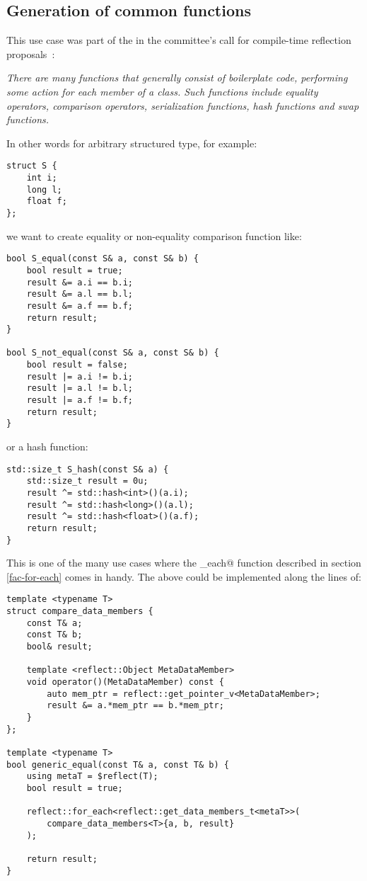 \subsection{Generation of common functions}
\label{use-case-common-func}

This use case was part of the  in the committee's
call for compile-time reflection proposals~\cite{ISOCPP-N3814}: 

{\em There are many functions that generally consist of boilerplate code,
performing some action for each member of a class. Such functions include
equality operators, comparison operators, serialization functions,
hash functions and swap functions.
}

In other words for arbitrary structured type, for example:

\begin{verbatim}
struct S {
	int i;
	long l;
	float f;
};
\end{verbatim}

we want to create equality or non-equality comparison function like:

\begin{verbatim}
bool S_equal(const S& a, const S& b) {
	bool result = true;
	result &= a.i == b.i;
	result &= a.l == b.l;
	result &= a.f == b.f;
	return result;
}

bool S_not_equal(const S& a, const S& b) {
	bool result = false;
	result |= a.i != b.i;
	result |= a.l != b.l;
	result |= a.f != b.f;
	return result;
}
\end{verbatim}

or a hash function:

\begin{verbatim}
std::size_t S_hash(const S& a) {
	std::size_t result = 0u;
	result ^= std::hash<int>()(a.i);
	result ^= std::hash<long>()(a.l);
	result ^= std::hash<float>()(a.f);
	return result;
}
\end{verbatim}

This is one of the many use cases where the \verb@for_each@ function
described in section \ref{fac-for-each} comes in handy. The above could be
implemented along the lines of:

\begin{verbatim}
template <typename T>
struct compare_data_members {
	const T& a;
	const T& b;
	bool& result;

	template <reflect::Object MetaDataMember>
	void operator()(MetaDataMember) const {
		auto mem_ptr = reflect::get_pointer_v<MetaDataMember>;
		result &= a.*mem_ptr == b.*mem_ptr;
	}
};

template <typename T>
bool generic_equal(const T& a, const T& b) {
	using metaT = $reflect(T);
	bool result = true;

	reflect::for_each<reflect::get_data_members_t<metaT>>(
		compare_data_members<T>{a, b, result}
	);

	return result;
}
\end{verbatim}

